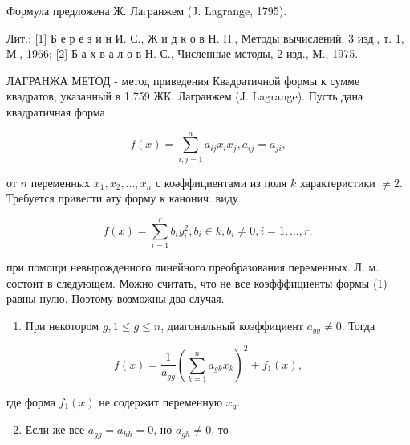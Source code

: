 \documentclass[10pt]{article}
\begin{document}
Формула предложена Ж. Лагранжем (J. Lagrange, 1795).



Лит.: [1] Б е р е з и н И. С., Ж и д к о в Н. П., Методы вычислений, 3 изд., т. 1, М., 1966; [2] Б а х в а л о в Н. С., Численные методы, 2 изд., М., 1975.



ЛАГРАНЖА МЕТОД - метод приведения Квадратичной формы к сумме квадратов, указанный в 1.759 ЖК. Лагранжем (J. Lagrange). Пусть дана квадратичная форма



\[

f(x)=\sum_{i, j=1}^{n} a_{i j} x_{i} x_{j}, a_{i j}=a_{j i},

\]



от $n$ переменных $x_{1}, x_{2}, \ldots, x_{n}$ с коәффициентами из поля $k$ характеристики $\neq 2$. Требуется привести әту форму к канонич. виду



\[

f(x)=\sum_{i=1}^{r} b_{i} y_{i}^{2}, b_{i} \in k, b_{i} \neq 0, i=1, \ldots, r,

\]



при помощи невырожденного линейного преобразования переменных. Л. м. состоит в следующем. Можно считать, что не все коэфффициенты формы (1) равны нулю. Поэтому возможны два случая.



\begin{enumerate}

  \item При некотором $g, 1 \leqslant g \leqslant n$, диагональный коэффициент $a_{g g} \neq 0$. Тогда

\end{enumerate}



\[

f(x)=\frac{1}{a_{g g}}\left(\sum_{k=1}^{n} a_{g k} x_{k}\right)^{2}+f_{1}(x),

\]



где форма $f_{1}(x)$ не содержит переменную $x_{g}$.



\begin{enumerate}

  \setcounter{enumi}{1}

  \item Если же все $a_{g g}=a_{h h}=0$, но $a_{g h} \neq 0$, то

\end{enumerate}
\end{document}
